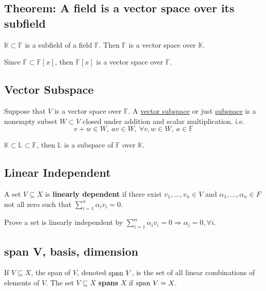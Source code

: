 \documentclass[11pt]{elegantbook}
\begin{document}
\subsection{Theorem: A field is a vector space over its subfield}
\begin{theorem}
    $\mathbb{K}\subset\mathbb{F}$ is a subfield of a field $\mathbb{F}$. Then $\mathbb{F}$ is a vector space over $\mathbb{K}$.
\end{theorem}
\begin{example}
    Since $\mathbb{F}\subset \mathbb{F}[x]$, then $\mathbb{F}[x]$ is a vector space over $\mathbb{F}$.
\end{example}
\subsection{Vector Subspace}
\begin{definition}
    \normalfont
    Suppose that $V$ is a vector space over $\mathbb{F}$. A \underline{vector subspace} or just \underline{subspace} is a nonempty subset $W\subset V$ closed under addition and scalar multiplication. i.e. $$v+w\in W,\ av\in W,\ \forall v,w\in W,\ a\in \mathbb{F}$$
\end{definition}
\begin{example}
$\mathbb{K}\subset \mathbb{L}\subset \mathbb{F}$, then $\mathbb{L}$ is a subspace of $\mathbb{F}$ over $\mathbb{K}$.
\end{example}
\subsection{Linear Independent}
\begin{definition}
    \normalfont
    A set $V \subseteq X$ is \textbf{linearly dependent} if there exist $v_1,...,v_n \in V$ and $\alpha_1,...,\alpha_n \in F$ not all zero such that $\sum_{i=1}^n\alpha_iv_i=0$.
\end{definition}
Prove a set is linearly independent by $\sum_{i=1}^n\alpha_iv_i=0 \Rightarrow \alpha_i=0,\forall i$.

\subsection{span V, basis, dimension}
\begin{definition}[Span]
    \normalfont
    If $V \subseteq X$, the span of $V$, denoted $\textnormal{span }V$, is the set of all linear combinations of elements of $V$.
    The set $V \subseteq X$ \textbf{spans} $X$ if $\textnormal{span }V=X$.
\end{definition}
\end{document}
